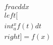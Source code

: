 \documentclass[preview]{standalone}
\begin{document}
\begin{align*}
\quad\\frac{d}{dx} \quad\\left[ \quad\\int_{a}^{x} f(t) dt \quad\\right] = f(x)
\end{align*}
\end{document}
